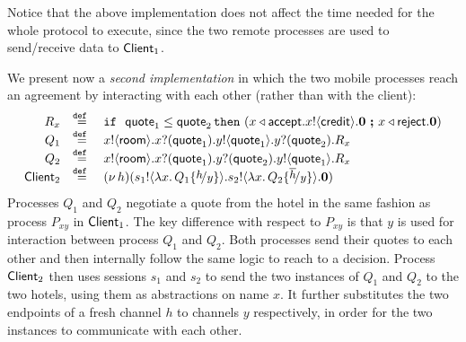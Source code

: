 \begin{example}
Notice that	the above implementation does not affect
the time needed for the whole protocol to execute,
since the two remote processes are used
to send/receive data to $\mathsf{Client}_1$.

We present now a \emph{second  implementation}
in which the two mobile processes reach an agreement
by interacting with each other (rather than with the client):
%
\[
	\begin{array}{rcl}
	    R_x & \defeq & \If\ \Quote_1 \leq \Quote_2 \, \Then  (\bsel{x}{\accept} \bout{x}{\creditc} \inact \  \Else \ \bsel{x}{\reject} \inact) \\
		Q_1 &\defeq&	\bout{x}{\rtype} \binp{x}{\Quote_1} \bout{y}{\Quote_1} \binp{y}{\Quote_2} R_x \\
		Q_2 &\defeq&	\bout{x}{\rtype} \binp{x}{\Quote_1} \binp{y}{\Quote_2} \bout{y}{\Quote_1} R_x \\
		\Client_2 &\defeq& \newsp{h}{\bout{s_1}{\abs{x}{Q_1 \subst{h}{y}}} \bout{s_2}{\abs{x}{Q_2 \subst{\dual{h}}{y}}} \inact}
	\end{array}
\]
Processes $Q_1$ and $Q_2$  negotiate a quote from the
		hotel in the same fashion as process $P_{xy}$ in $\mathsf{Client}_1$.
		The key difference with respect to $P_{xy}$ is that $y$ is used for
		interaction between process $Q_1$ and $Q_2$. Both processes send
		their quotes to each other and then internally follow the same
		logic to reach to a decision.
		Process  $\mathsf{Client}_2$ then uses sessions $s_1$ and $s_2$ to send the two
		instances of $Q_1$ and $Q_2$ to the two hotels, using them 
	 as abstractions
		on name $x$. It further substitutes
		the two endpoints of a fresh channel $h$ to channels $y$ respectively,
		in order for the two instances to communicate with each other.




\end{example}
